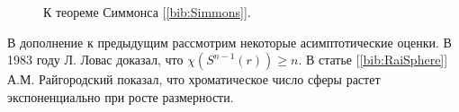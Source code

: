 \begin{figure}[h]
\centering
\captionsetup{justification=centering}
\begin{minipage}[h]{0.5\linewidth}
\end{minipage}\hfill
\begin{minipage}[h]{0.5\linewidth}
\end{minipage}\hfill
\caption{К теореме Симмонса [\ref{bib:Simmons}].}
\label{chapter1:fig:simmons}
\end{figure}

В дополнение к предыдущим рассмотрим некоторые асимптотические оценки. 
В 1983 году  Л. Ловас доказал, что  $\chi(S^{n-1}(r)) \geq n$. В статье [\ref{bib:RaiSphere}] А.М. Райгородский показал, что хроматическое число сферы растет экспоненциально при росте размерности.

